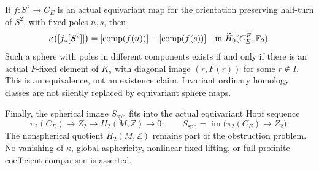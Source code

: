 If $f:S^2\to C_E$ is an actual equivariant map for the orientation
preserving half-turn of $S^2$, with fixed poles $n,s$, then
\begin{equation}\label{eq:B102-sphere-value}
 \kappa\bigl([f_*[S^2]]\bigr)
   =[\operatorname{comp}(f(n))]-[\operatorname{comp}(f(s))]
       \quad\hbox{in }\widetilde H_0(C_E^F,\mathbb F_2).
\end{equation}
Such a sphere with poles in different components exists if and only
if there is an actual $F$-fixed element of $K_s$ with diagonal image
$(r,F(r))$ for some $r\notin I$. This is an equivalence, not an
existence claim. Invariant ordinary homology classes are not silently
replaced by equivariant sphere maps.

Finally, the spherical image $S_{\mathrm{sph}}$ fits into the actual
equivariant Hopf sequence
\begin{equation}\label{eq:B102-Hopf}
 \pi_2(C_E)\longrightarrow Z_2
       \longrightarrow H_2(M,\mathbb Z)\longrightarrow0,
 \qquad S_{\mathrm{sph}}=
       \operatorname{im}\bigl(\pi_2(C_E)\to Z_2\bigr).
\end{equation}
The nonspherical quotient $H_2(M,\mathbb Z)$ remains part of the
obstruction problem. No vanishing of $\kappa$, global asphericity,
nonlinear fixed lifting, or full profinite coefficient comparison is
asserted.

